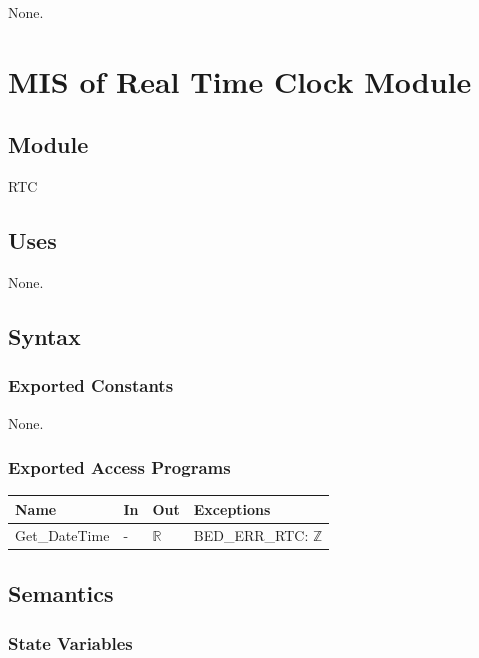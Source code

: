 \documentclass[12pt, titlepage]{article}
\begin{document}
None.

\newpage




\section{MIS of Real Time Clock Module} \label{mRTC} 

\subsection{Module}

RTC

\subsection{Uses}

None.

\subsection{Syntax}

\subsubsection{Exported Constants}

None.

\subsubsection{Exported Access Programs}

\begin{center}
\begin{tabular}{p{3cm} p{3cm} p{2cm} p{4cm}}
\hline
\textbf{Name} & \textbf{In} & \textbf{Out} & \textbf{Exceptions} \\
\hline
Get\_DateTime & - & $ \mathbb{R}$ & BED\_ERR\_RTC: $ \mathbb{Z}$ \\
\hline
\end{tabular}
\end{center}

\subsection{Semantics}

\subsubsection{State Variables}
\end{document}
